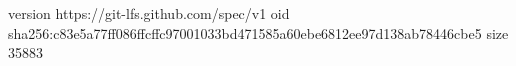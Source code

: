 version https://git-lfs.github.com/spec/v1
oid sha256:c83e5a77ff086ffcffc97001033bd471585a60ebe6812ee97d138ab78446cbe5
size 35883
